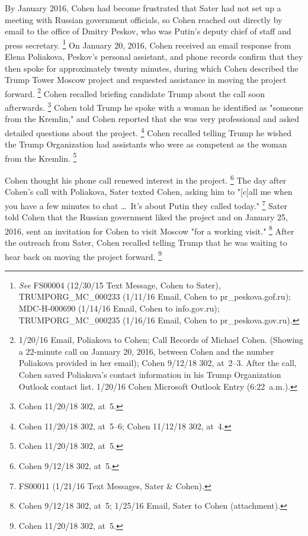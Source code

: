 {By January 2016, Cohen had become frustrated that Sater had not set up a meeting with Russian government officials, so Cohen reached out directly by email to the office of Dmitry Peskov, who was Putin's deputy chief of staff and press secretary.%
\footnote{\textit{See} FS00004 (12/30/15 Text Message, Cohen to Sater), TRUMPORG\_MC\_000233 (1/11/16 Email, Cohen to pr\_peskova\@prpress.gof.ru);
MDC-H-000690 (1/14/16 Email, Cohen to info\@prpress.gov.ru);
TRUMPORG\_MC\_000235 (1/16/16 Email, Cohen to pr\_peskova\@prpress.gov.ru).}
On January 20, 2016, Cohen received an email response from Elena Poliakova, Peskov's personal assistant, and phone records confirm that they then spoke for approximately twenty minutes, during which Cohen described the Trump Tower Moscow project and requested assistance in moving the project forward.%
\footnote{1/20/16 Email, Poliakova to Cohen;
Call Records of Michael Cohen.
(Showing a 22-minute call on January 20, 2016, between Cohen and the number Poliakova provided in her email);
Cohen 9/12/18 302, at~2--3.
After the call, Cohen saved Poliakova's contact information in his Trump Organization Outlook contact list.
1/20/16 Cohen Microsoft Outlook Entry (6:22~a.m.).}
Cohen recalled briefing candidate Trump about the call soon afterwards.%
\footnote{Cohen 11/20/18 302, at~5.}
Cohen told Trump he spoke with a woman he identified as "someone from the Kremlin," and Cohen reported that she was very professional and asked detailed questions about the project.%
\footnote{Cohen 11/20/18 302, at~5--6;
Cohen 11/12/18 302, at~4.}
Cohen recalled telling Trump he wished the Trump Organization had assistants who were as competent as the woman from the Kremlin.%
\footnote{Cohen 11/20/18 302, at~5.}

Cohen thought his phone call renewed interest in the project.%
\footnote{Cohen 9/12/18 302, at~5.}
The day after Cohen's call with Poliakova, Sater texted Cohen, asking him to "[c]all me when you have a few minutes to chat \dots\ It's about Putin they called today."%
\footnote{FS00011 (1/21/16 Text Messages, Sater \& Cohen).}
Sater told Cohen that the Russian government liked the project and on January 25, 2016, sent an invitation for Cohen to visit Moscow "for a working visit."%
\footnote{Cohen 9/12/18 302, at~5;
1/25/16 Email, Sater to Cohen (attachment).}
After the outreach from Sater, Cohen recalled telling Trump that he was waiting to hear back on moving the project forward.%
\footnote{Cohen 11/20/18 302, at~5.}

}
